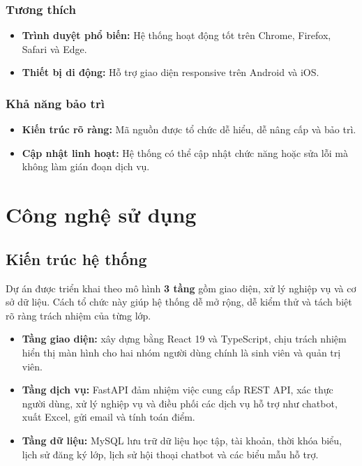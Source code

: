 \documentclass[12pt,a4paper]{report}
\begin{document}
\subsection{Tương thích}
\begin{itemize}
    \item \textbf{Trình duyệt phổ biến:} Hệ thống hoạt động tốt trên Chrome, Firefox, Safari và Edge.
    \item \textbf{Thiết bị di động:} Hỗ trợ giao diện responsive trên Android và iOS.
\end{itemize}

\subsection{Khả năng bảo trì}
\begin{itemize}
    \item \textbf{Kiến trúc rõ ràng:} Mã nguồn được tổ chức dễ hiểu, dễ nâng cấp và bảo trì.
    \item \textbf{Cập nhật linh hoạt:} Hệ thống có thể cập nhật chức năng hoặc sửa lỗi mà không làm gián đoạn dịch vụ.
\end{itemize}

\chapter{Công nghệ sử dụng}

\section{Kiến trúc hệ thống}
Dự án được triển khai theo mô hình \textbf{3 tầng} gồm giao diện, xử lý nghiệp vụ và cơ sở dữ liệu. Cách tổ chức này giúp hệ thống dễ mở rộng, dễ kiểm thử và tách biệt rõ ràng trách nhiệm của từng lớp.

\begin{itemize}
    \item \textbf{Tầng giao diện:} xây dựng bằng React 19 và TypeScript, chịu trách nhiệm hiển thị màn hình cho hai nhóm người dùng chính là sinh viên và quản trị viên.
    \item \textbf{Tầng dịch vụ:} FastAPI đảm nhiệm việc cung cấp REST API, xác thực người dùng, xử lý nghiệp vụ và điều phối các dịch vụ hỗ trợ như chatbot, xuất Excel, gửi email và tính toán điểm.
    \item \textbf{Tầng dữ liệu:} MySQL lưu trữ dữ liệu học tập, tài khoản, thời khóa biểu, lịch sử đăng ký lớp, lịch sử hội thoại chatbot và các biểu mẫu hỗ trợ.
\end{itemize}
\end{document}
